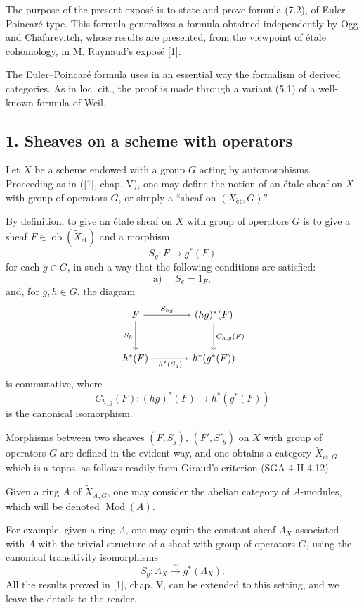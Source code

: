 \documentclass[11pt]{article}
\providecommand{\et}{\mathrm{\acute{e}t}}
\providecommand{\Ob}{\operatorname{ob}}
\providecommand{\Ob}{\operatorname{ob}}
\providecommand{\Ob}{\operatorname{Ob}}
\providecommand{\Mod}{\operatorname{Mod}}
\providecommand{\Ob}{\operatorname{ob}}
\providecommand{\Ob}{\operatorname{Ob}}
\providecommand{\et}{\acute{e}t}
\begin{document}
The purpose of the present exposé is to state and prove formula (7.2), of Euler--Poincaré type. This formula generalizes a formula obtained independently by Ogg and Chafarevitch, whose results are presented, from the viewpoint of étale cohomology, in M. Raynaud's exposé [1].

The Euler--Poincaré formula uses in an essential way the formalism of derived categories. As in loc. cit., the proof is made through a variant (5.1) of a well-known formula of Weil.

\subsection*{1. Sheaves on a scheme with operators}

Let $X$ be a scheme endowed with a group $G$ acting by automorphisms. Proceeding as in ([1], chap. V), one may define the notion of an étale sheaf on $X$ with group of operators $G$, or simply a “sheaf on $(X_{\et},G)$”.

By definition, to give an étale sheaf on $X$ with group of operators $G$ is to give a sheaf $F\in \Ob(\widetilde X_{\et})$ and a morphism
\[
S_g:F\longrightarrow g^*(F)
\]
for each $g\in G$, in such a way that the following conditions are satisfied:
\[
\text{a) }\quad S_e=1_F,
\]
and, for $g,h\in G$, the diagram
\[
\begin{tikzcd}[column sep=large,row sep=large]
F \arrow[r,"S_{hg}"] \arrow[d,"S_h"'] & (hg)^*(F) \arrow[d,"C_{h,g}(F)"]\\
h^*(F) \arrow[r,"h^*(S_g)"'] & h^*(g^*(F))
\end{tikzcd}
\]
is commutative, where
\[
C_{h,g}(F):(hg)^*(F)\longrightarrow h^*(g^*(F))
\]
is the canonical isomorphism.

Morphisms between two sheaves $(F,S_g)$, $(F',S'_g)$ on $X$ with group of operators $G$ are defined in the evident way, and one obtains a category $\widetilde X_{\et,G}$ which is a topos, as follows readily from Giraud's criterion (SGA 4 II 4.12).

Given a ring $A$ of $\widetilde X_{\et,G}$, one may consider the abelian category of $A$-modules, which will be denoted $\Mod(A)$.

For example, given a ring $\Lambda$, one may equip the constant sheaf $\Lambda_X$ associated with $\Lambda$ with the trivial structure of a sheaf with group of operators $G$, using the canonical transitivity isomorphisms
\[
S_g:\Lambda_X\xrightarrow{\sim}g^*(\Lambda_X).
\]
All the results proved in [1], chap. V, can be extended to this setting, and we leave the details to the reader.
\end{document}
